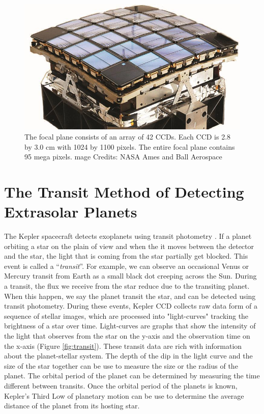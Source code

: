 \begin{figure}[!h]
\begin{center}
        \includegraphics[width=0.3\textheight]{img/kccd.png}
	\caption{The focal plane consists of an array of 42 CCDs. Each CCD is 2.8 by 3.0 cm with 1024 by 1100 pixels. The entire focal plane contains 95 mega pixels.
mage Credits: NASA Ames and Ball Aerospace} \label{fig:kccd}
\end{center}
\end{figure}

\section{The Transit Method of Detecting Extrasolar Planets}

The Kepler spacecraft detects exoplanets using transit photometry \cite{2000ApJ...529L..45C}. If a planet orbiting a star on the plain of view and when the it moves between the detector and the star, the light that is coming from the star partially get blocked. This event is called a ``{\emph {transit}}''. For example, we can observe an occasional Venus or Mercury transit from Earth as a small black dot creeping across the Sun. During a transit, the flux we receive from the star reduce due to the transiting planet. When this happen, we say the planet transit the star, and can be detected using transit photometry. During these events, Kepler CCD collects raw data form of a sequence of stellar images, which are processed into "light-curves" tracking the brightness of a star over time. Light-curves are graphs that show the intensity of the light that observes from the star on the y-axis and the observation time on the x-axis (Figure \ref{fig:transit}). These transit data are rich with information about the planet-stellar system. The depth of the dip in the light curve and the size of the star together can be use to measure the size or the radius of the planet. The orbital period of the planet can be determined by measuring the time different between transits. Once the orbital period of the planets is known, Kepler's Third Low of planetary motion can be use to determine the average distance of the planet from its hosting star.

